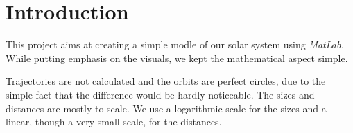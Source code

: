\chapter{Introduction}
This project aims at creating a simple modle of our solar system using {\em MatLab.} While putting emphasis on the visuals, we kept the mathematical aspect simple.

Trajectories are not calculated and the orbits are perfect circles, due to the simple fact that the difference would be hardly noticeable. The sizes and distances are mostly to scale. We use a logarithmic scale for the sizes and a linear, though a very small scale, for the distances. 
\pagebreak